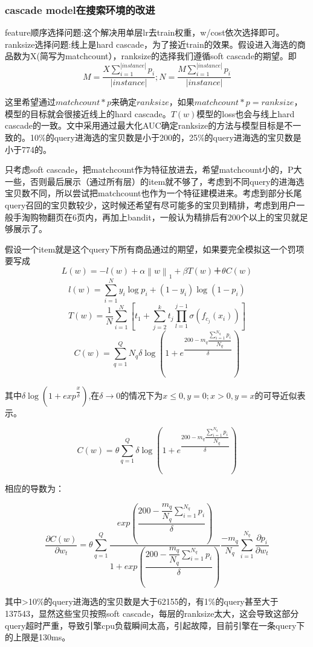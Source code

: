 \subsubsection{cascade model在搜索环境的改进}
feature顺序选择问题:这个解决用单层lr去train权重，w/cost依次选择即可。
ranksize选择问题:线上是hard cascade，为了接近train的效果。假设进入海选的商品数为X(简写为matchcount），ranksize的选择我们遵循soft cascade的期望。即
$$M=\dfrac{{X\sum_{i=1}^{|instance|}p_i}}{|instance|};N=\dfrac{M\sum_{i=1}^{|instance|}p_i}{|instance|}$$


这里希望通过${matchcount}*p$来确定$ranksize$，如果${matchcount}*p=ranksize$，模型的目标就会很接近线上的hard cascade。$T(w)$模型的loss也会与线上hard cascade的一致。文中采用通过最大化AUC确定ranksize的方法与模型目标是不一致的。10\%的query进海选的宝贝数是小于200的，25\%的query进海选的宝贝数是小于774的。

只考虑soft cascade，把matchcount作为特征放进去，希望matchcount小的，P大一些，否则最后展示（通过所有层）的item就不够了，考虑到不同query的进海选宝贝数不同，所以尝试把matchcount也作为一个特征建模进来。考虑到部分长尾query召回的宝贝数较少，这时候还希望有尽可能多的宝贝到精排，考虑到用户一般手淘购物翻页在6页内，再加上bandit，一般认为精排后有200个以上的宝贝就足够展示了。

假设一个item就是这个query下所有商品通过的期望，如果要完全模拟这一个罚项要写成
$$L(w)= -l(w)+\alpha\left\|w\right\|_1+{\beta}T(w)＋{\theta}C(w)$$
$$l(w)=\sum_{i=1}^Ny_i\mathop{\log}p_i+(1-y_i)\mathop{\log}(1-p_i)$$
$$T(w)=\dfrac{1}{N}\sum_{i=1}^N[t_1+\sum_{j=2}^kt_j\prod\limits_{l=1}^{j-1}\sigma(f_{c_j}(x_i))]$$
$$C(w)=\sum_{q=1}^{Q}N_q{\delta}\mathop{\log}(1+e^{\dfrac{200-{m}_q{\dfrac{{\sum}_{i=1}^{N_q}p_i}{N_q}}}{\delta}})$$

其中${\delta}\mathop{\log}(1+exp^{\dfrac{x}{\delta}})$,在$\delta\to0$的情况下为$x{\le}0,y=0;x>0,y=x$的可导近似表示。

$$C(w)={\theta}\sum_{q=1}^{Q}{\delta}\mathop{\log}(1+e^{\dfrac{200-{m}_q{\dfrac{{\sum}_{i=1}^{N_q}p_i}{N_q}}}{\delta}})$$

相应的导数为：

$$\dfrac{{\partial}C(w)}{{\partial}w_t}={\theta}\sum_{q=1}^{Q}\dfrac{exp({\dfrac{200-{\dfrac{{m}_q}{N_q}}{\sum}_{i=1}^{N_q}p_i}{\delta}})}{1+exp({\dfrac{200-{\dfrac{{m}_q}{N_q}}{\sum}_{i=1}^{N_q}p_i}{\delta}})}{\dfrac{-m_q}{N_q}}{\sum}_{i=1}^{N_q}\dfrac{{\partial}p_i}{{\partial}w_t}$$

其中>10\%的query进海选的宝贝数是大于62155的，有1\%的query甚至大于137543，显然这些宝贝按照soft cascade，每层的ranksize太大，这会导致这部分query超时严重，导致引擎cpu负载瞬间太高，引起故障，目前引擎在一条query下的上限是130ms。

